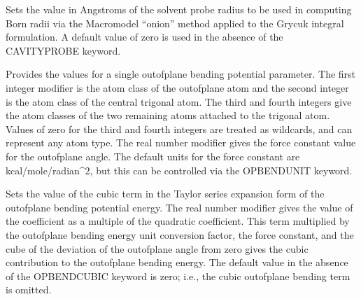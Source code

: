 \documentclass[letterpaper,11pt,english]{sphinxmanual}
\begin{document}
\ignorespaces {}\label{\detokenize{text/keywords:key-onion-probe}}\begin{description}
\sphinxAtStartPar
Sets the value in Angstroms of the solvent probe radius to be used in computing Born radii via the Macromodel “onion” method applied to the Grycuk integral formulation. A default value of zero is used in the absence of the CAVITY\sphinxhyphen{}PROBE keyword.

\end{description}

\ignorespaces {}\label{\detokenize{text/keywords:key-opbend}}\begin{description}
\sphinxAtStartPar
Provides the values for a single out\sphinxhyphen{}of\sphinxhyphen{}plane bending potential parameter. The first integer modifier is the atom class of the out\sphinxhyphen{}of\sphinxhyphen{}plane atom and the second integer is the atom class of the central trigonal atom. The third and fourth integers give the atom classes of the two remaining atoms attached to the trigonal atom. Values of zero for the third and fourth integers are treated as wildcards, and can represent any atom type. The real number modifier gives the force constant value for the out\sphinxhyphen{}of\sphinxhyphen{}plane angle. The default units for the force constant are kcal/mole/radian\textasciicircum{}2, but this can be controlled via the OPBENDUNIT keyword.

\end{description}

\ignorespaces {}\label{\detokenize{text/keywords:key-opbend-cubic}}\begin{description}
\sphinxAtStartPar
Sets the value of the cubic term in the Taylor series expansion form of the out\sphinxhyphen{}of\sphinxhyphen{}plane bending potential energy. The real number modifier gives the value of the coefficient as a multiple of the quadratic coefficient. This term multiplied by the out\sphinxhyphen{}of\sphinxhyphen{}plane bending energy unit conversion factor, the force constant, and the cube of the deviation of the out\sphinxhyphen{}of\sphinxhyphen{}plane angle from zero gives the cubic contribution to the out\sphinxhyphen{}of\sphinxhyphen{}plane bending energy. The default value in the absence of the OPBEND\sphinxhyphen{}CUBIC keyword is zero; i.e., the cubic out\sphinxhyphen{}of\sphinxhyphen{}plane bending term is omitted.

\end{description}
\end{document}
